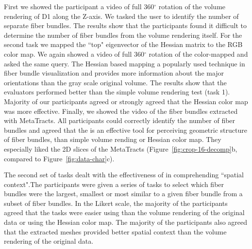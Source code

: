  
First we showed the participant a video of full 360{$^\circ$} rotation of the volume rendering of D1 along the Z-axis. We tasked the user to identify the number of separate fiber bundles. The results show that the participants found it difficult to determine the number of fiber bundles from the volume rendering itself. For the second task we mapped the ``top" eigenvector of the Hessian matrix to the RGB color map. We again showed a video of full 360{$^\circ$} rotation of the color-mapped and asked the same query. The Hessian based mapping a popularly used technique in fiber bundle visualization and provides more information about the major orientations than the  gray scale original volume. The results show that the evaluators performed better than the simple volume rendering test (task 1). Majority of our participants agreed or strongly agreed that the Hessian color map was more effective. Finally, we showed the video of the fiber bundles extracted with MetaTracts. 
All participants could correctly identify the number of fiber bundles and agreed that the \mt  is an effective tool for perceiving geometric structure  of fiber bundles, than simple volume rending or Hessian color map. They especially liked the 2D slices of the MetaTracts (Figure~\ref{fig:crop-16-decomp}b, compared to Figure~\ref{fig:data-char}c).

The second set of tasks dealt with the effectiveness of \mt in comprehending ``spatial context".The participants were given a series of tasks to select which fiber bundles were the largest, smallest or most similar to a given fiber bundle from a subset of fiber bundles. In the Likert scale, the majority of the participants agreed that the tasks were easier using \mt than the volume rendering of the original data or using the Hessian color map. 
The majority of the participants also agreed that the extracted meshes provided better spatial context than the volume rendering of the original data. 
